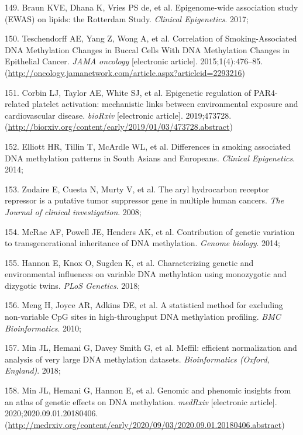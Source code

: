 \documentclass[11pt,oneside]{bristolthesis}
\newenvironment{cslreferences}%
  {}%
  {\par}
\begin{document}
\begin{cslreferences}
\leavevmode\hypertarget{ref-Braun2017}{}%
149. Braun KVE, Dhana K, Vries PS de, et al. Epigenome-wide association study (EWAS) on lipids: the Rotterdam Study. \emph{Clinical Epigenetics}. 2017;

\leavevmode\hypertarget{ref-Teschendorff2015}{}%
150. Teschendorff AE, Yang Z, Wong A, et al. Correlation of Smoking-Associated DNA Methylation Changes in Buccal Cells With DNA Methylation Changes in Epithelial Cancer. \emph{JAMA oncology} {[}electronic article{]}. 2015;1(4):476--85. (\url{http://oncology.jamanetwork.com/article.aspx?articleid=2293216})

\leavevmode\hypertarget{ref-Corbin2019}{}%
151. Corbin LJ, Taylor AE, White SJ, et al. Epigenetic regulation of PAR4-related platelet activation: mechanistic links between environmental exposure and cardiovascular disease. \emph{bioRxiv} {[}electronic article{]}. 2019;473728. (\url{http://biorxiv.org/content/early/2019/01/03/473728.abstract})

\leavevmode\hypertarget{ref-Elliott2014}{}%
152. Elliott HR, Tillin T, McArdle WL, et al. Differences in smoking associated DNA methylation patterns in South Asians and Europeans. \emph{Clinical Epigenetics}. 2014;

\leavevmode\hypertarget{ref-Zudaire2008}{}%
153. Zudaire E, Cuesta N, Murty V, et al. The aryl hydrocarbon receptor repressor is a putative tumor suppressor gene in multiple human cancers. \emph{The Journal of clinical investigation}. 2008;

\leavevmode\hypertarget{ref-McRae2014}{}%
154. McRae AF, Powell JE, Henders AK, et al. Contribution of genetic variation to transgenerational inheritance of DNA methylation. \emph{Genome biology}. 2014;

\leavevmode\hypertarget{ref-Hannon2018}{}%
155. Hannon E, Knox O, Sugden K, et al. Characterizing genetic and environmental influences on variable DNA methylation using monozygotic and dizygotic twins. \emph{PLoS Genetics}. 2018;

\leavevmode\hypertarget{ref-Meng2010}{}%
156. Meng H, Joyce AR, Adkins DE, et al. A statistical method for excluding non-variable CpG sites in high-throughput DNA methylation profiling. \emph{BMC Bioinformatics}. 2010;

\leavevmode\hypertarget{ref-Min2018}{}%
157. Min JL, Hemani G, Davey Smith G, et al. Meffil: efficient normalization and analysis of very large DNA methylation datasets. \emph{Bioinformatics (Oxford, England)}. 2018;

\leavevmode\hypertarget{ref-Min2020}{}%
158. Min JL, Hemani G, Hannon E, et al. Genomic and phenomic insights from an atlas of genetic effects on DNA methylation. \emph{medRxiv} {[}electronic article{]}. 2020;2020.09.01.20180406. (\url{http://medrxiv.org/content/early/2020/09/03/2020.09.01.20180406.abstract})


\end{cslreferences}
\end{document}
